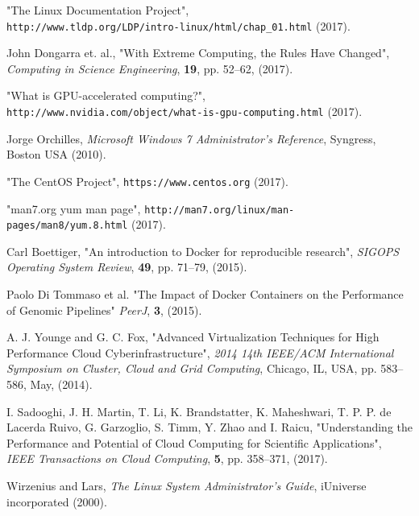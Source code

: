 \documentclass[twoside,a4paper,12pt,english]{inac17}
\begin{document}
\begin{thebibliography}{99} %

 "The Linux Documentation Project", \\\verb#http://www.tldp.org/LDP/intro-linux/html/chap_01.html# (2017).

 John Dongarra et. al., "With Extreme Computing, the Rules Have Changed", \textit{Computing in Science Engineering}, \textbf{19}, pp. 52--62, (2017).

 "What is GPU-accelerated computing?", \\\verb#http://www.nvidia.com/object/what-is-gpu-computing.html# (2017).

 Jorge Orchilles, \textit{Microsoft Windows 7 Administrator's Reference}, Syngress, Boston USA (2010).


 "The CentOS Project", \verb#https://www.centos.org# (2017).

 "man7.org yum man page", \verb#http://man7.org/linux/man-pages/man8/yum.8.html# (2017).

 Carl Boettiger, "An introduction to Docker for reproducible research", \textit{SIGOPS Operating System Review}, \textbf{49}, pp. 71--79, (2015).

 Paolo Di Tommaso et al. "The Impact of Docker Containers on the Performance of Genomic Pipelines" \textit{PeerJ}, \textbf{3}, (2015).

 A. J. Younge and G. C. Fox, "Advanced Virtualization Techniques for High Performance Cloud Cyberinfrastructure", \textit{2014 14th IEEE/ACM International Symposium on Cluster, Cloud and Grid Computing}, Chicago, IL, USA, pp. 583--586, May, (2014).
  
 I. Sadooghi, J. H. Martin, T. Li, K. Brandstatter, K. Maheshwari, T. P. P. de Lacerda Ruivo, G. Garzoglio, S. Timm, Y. Zhao and I. Raicu, "Understanding the Performance and Potential of Cloud Computing for Scientific Applications", \textit{IEEE Transactions on Cloud Computing}, \textbf{5}, pp. 358--371, (2017).
  
 Wirzenius and Lars, \textit{The  Linux System Administrator's Guide}, iUniverse incorporated (2000).


\end{thebibliography}
\end{document}
